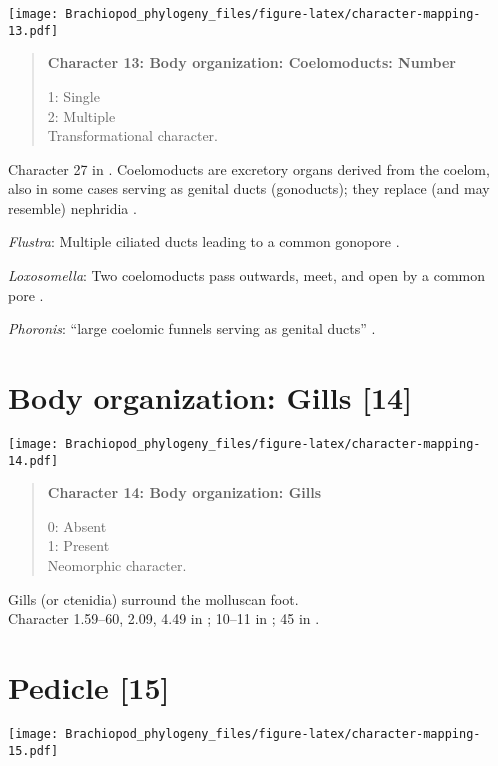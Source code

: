 \documentclass[openany]{book}
\theoremstyle{definition}
\theoremstyle{definition}
\theoremstyle{definition}
\theoremstyle{remark}
\begin{document}
\texttt{[image: Brachiopod\_phylogeny\_files/figure-latex/character-mapping-13.pdf]}

\begin{quote}
\textbf{Character 13: Body organization: Coelomoducts: Number}

1: Single\\
2: Multiple\\
Transformational character.
\end{quote}

Character 27 in \citet{Haszprunar2000}. Coelomoducts are excretory
organs derived from the coelom, also in some cases serving as genital
ducts (gonoducts); they replace (and may resemble) nephridia
\citep{Goodrich1945}.

\hypertarget{Flustra-coding-13}{}
\emph{Flustra}: Multiple ciliated ducts leading to a common gonopore
\citep{Goodrich1945}.

\hypertarget{Loxosomella-coding-13}{}
\emph{Loxosomella}: Two coelomoducts pass outwards, meet, and open by a
common pore \citep{Goodrich1945}.

\hypertarget{Phoronis-coding-13}{}
\emph{Phoronis}: ``large coelomic funnels serving as genital ducts''
\citep{Goodrich1945}.

\section{Body organization: Gills
{[}14{]}}\label{body-organization-gills-14}

\texttt{[image: Brachiopod\_phylogeny\_files/figure-latex/character-mapping-14.pdf]}

\begin{quote}
\textbf{Character 14: Body organization: Gills}

0: Absent\\
1: Present\\
Neomorphic character.
\end{quote}

Gills (or ctenidia) surround the molluscan foot.\\
Character 1.59--60, 2.09, 4.49 in \citet{SPS1996}; 10--11 in
\citet{Haszprunar2000}; 45 in \citet{Sutton2012}.

\section{Pedicle {[}15{]}}\label{pedicle-15}

\texttt{[image: Brachiopod\_phylogeny\_files/figure-latex/character-mapping-15.pdf]}
\end{document}
